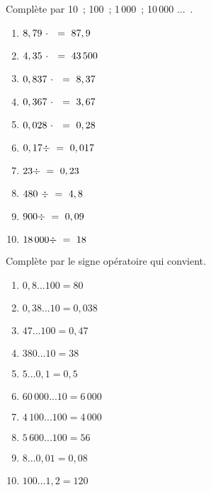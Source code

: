 \begin{exercice}
Complète par 10 ; 100 ; 1\,000 ; 10\,000 ... .
\begin{enumerate} 
 \item $8,79 \cdot \dotfill = 87,9$ \hspace*{11em}
 
 \item $4,35 \cdot \dotfill = 43\,500$ \hspace*{11em}
 
 \item $0,837 \cdot \dotfill = 8,37$ \hspace*{11em}
 
 \item $0,367 \cdot \dotfill = 3,67$ \hspace*{11em}
 
 \item $0,028 \cdot \dotfill = 0,28$ \hspace*{11em}
 
 \item $0,17 \div \dotfill = 0,017$ \hspace*{11em}
 
 \item $23 \div \dotfill = 0,23$ \hspace*{11em}
 
 \item $480 \div \dotfill = 4,8$ \hspace*{11em}
 
 \item $900 \div \dotfill = 0,09$ \hspace*{11em}
 
 \item \hspace{0.25em}$18\,000 \div \dotfill = 18$ \hspace*{11em}
 
 \end{enumerate}
\end{exercice}


\begin{exercice}
Complète par le signe opératoire qui convient.
\begin{enumerate} 
 \item $0,8 ... 100 = 80$
 \item $0,38 ... 10 = 0,038$
 \item $47 ... 100 = 0,47$
 \item $380 ... 10 = 38$
 \item $5 ... 0,1 = 0,5$
 \item $60\,000 ... 10 = 6\,000$
 \item $4\,100 ... 100 = 4\,000$
 \item $5\,600 ... 100 = 56$
 \item $8 ... 0,01 = 0,08$
 \item \hspace{0.25em}$100 ... 1,2 = 120$
 \end{enumerate} %
\end{exercice}


